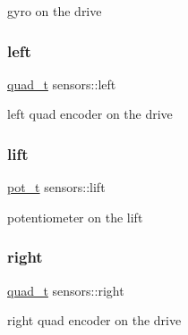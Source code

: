 gyro on the drive \mbox{\label{namespacesensors_ad7f873d16ad074c11f1e4c4f474be8ba}} 
\subsubsection{\texorpdfstring{left}{left}}
{\footnotesize\ttfamily \hyperlink{structsensors_1_1quad__t}{quad\+\_\+t} sensors\+::left}

left quad encoder on the drive \mbox{\label{namespacesensors_aadc3d3ede9ae5dc9a3c25bf89a113268}} 
\subsubsection{\texorpdfstring{lift}{lift}}
{\footnotesize\ttfamily \hyperlink{structsensors_1_1pot__t}{pot\+\_\+t} sensors\+::lift}

potentiometer on the lift \mbox{\label{namespacesensors_a53537b79680b539c5312bab3bf7d2eb8}} 
\subsubsection{\texorpdfstring{right}{right}}
{\footnotesize\ttfamily \hyperlink{structsensors_1_1quad__t}{quad\+\_\+t} sensors\+::right}

right quad encoder on the drive 